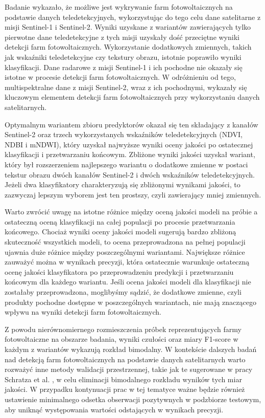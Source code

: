 \documentclass{amuthesis}
\begin{document}
Badanie wykazało, że możliwe jest wykrywanie farm fotowoltaicznych na
podstawie danych teledetekcyjnych, wykorzystując do tego celu dane
satelitarne z misji Sentinel-1 i Sentinel-2. Wyniki uzyskane z wariantów
zawierających tylko pierwotne dane teledetekcyjne z tych misji uzyskały
dość przeciętne wyniki detekcji farm fotowoltaicznych. Wykorzystanie
dodatkowych zmiennych, takich jak wskaźniki teledetekcyjne czy tekstury
obrazu, istotnie poprawiło wyniki klasyfikacji. Dane radarowe z misji
Sentinel-1 i ich pochodne nie okazały się istotne w procesie detekcji
farm fotowoltaicznych. W odróżnieniu od tego, multispektralne dane z
misji Sentinel-2, wraz z ich pochodnymi, wykazały się kluczowym
elementem detekcji farm fotowoltaicznych przy wykorzystaniu danych
satelitarnych.

Optymalnym wariantem zbioru predyktorów okazał się ten składający z
kanałów Sentinel-2 oraz trzech wykorzystanych wskaźników
teledetekcyjnych (NDVI, NDBI i mNDWI), który uzyskał najwyższe wyniki
oceny jakości po ostatecznej klasyfikacji i przetwarzaniu końcowym.
Zbliżone wyniki jakości uzyskał wariant, który był rozszerzeniem
najlepszego wariantu o dodatkowe zmienne w postaci tekstur obrazu dwóch
kanałów Sentinel-2 i dwóch wskaźników teledetekcyjnych. Jeżeli dwa
klasyfikatory charakteryzują się zbliżonymi wynikami jakości, to
zazwyczaj lepszym wyborem jest ten prostszy, czyli zawierający mniej
zmiennych.

Warto zwrócić uwagę na istotne różnice między oceną jakości modeli na
próbie a ostateczną oceną klasyfikacji na całej populacji po procesie
przetwarzania końcowego. Chociaż wyniki oceny jakości modeli sugerują
bardzo zbliżoną skuteczność wszystkich modeli, to ocena przeprowadzona
na pełnej populacji ujawnia duże różnice między poszczególnymi
wariantami. Największe różnice zauważyć można w wynikach precyzji, która
ostatecznie warunkuje ostateczną ocenę jakości klasyfikatora po
przeprowadzeniu predykcji i przetwarzaniu końcowym dla każdego wariantu.
Jeśli ocena jakości modeli dla klasyfikacji nie zostałaby
przeprowadzona, moglibyśmy sądzić, że dodatkowe zmienne, czyli produkty
pochodne dostępne w poszczególnych wariantach, nie mają znaczącego
wpływu na wyniki detekcji farm fotowoltaicznych.

Z powodu nierównomiernego rozmieszczenia próbek reprezentujących farmy
fotowoltaiczne na obszarze badania, wyniki czułości oraz miary F1-score
w każdym z wariantów wykazują rozkład bimodalny. W kontekście dalszych
badań nad detekcją farm fotowoltaicznych na podstawie danych
satelitarnych warto rozważyć inne metody walidacji przestrzennej, takie
jak te sugerowane w pracy Schratza et al.
\autocite*{schratz_2022_mlr3spatiotempcv}, w celu eliminacji bimodalnego
rozkładu wyników tych miar jakości. W przypadku kontynuacji prac w tej
tematyce ważne będzie również ustawienie minimalnego odsetka obserwacji
pozytywnych w podzbiorze testowym, aby uniknąć występowania wartości
odstających w wynikach precyzji.
\end{document}
